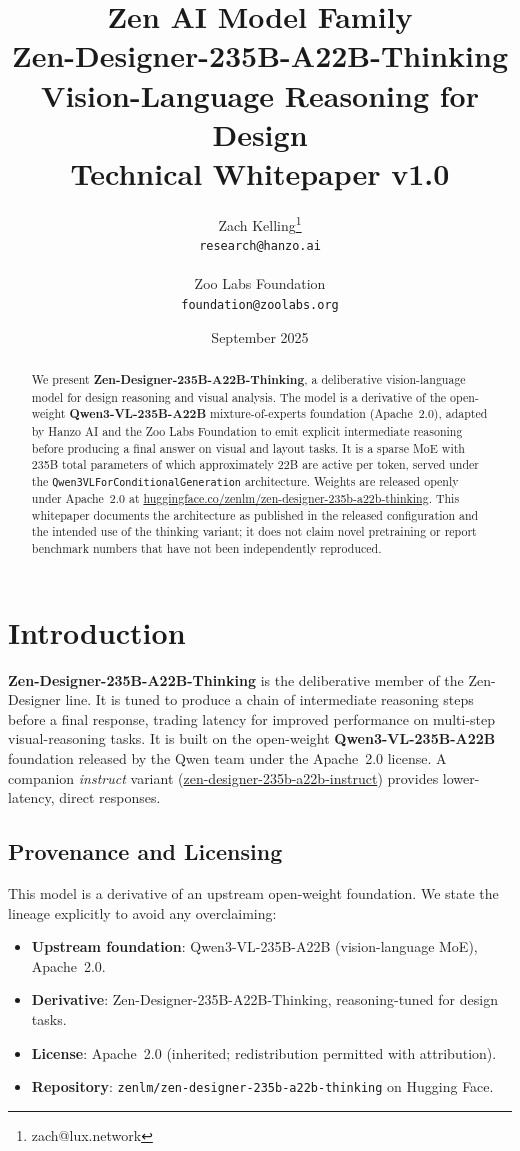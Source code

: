 \documentclass[11pt,a4paper]{article}
\title{
    \vspace{-2cm}
    \Large \textbf{Zen AI Model Family} \\
    \vspace{0.5cm}
    \Huge \textbf{Zen-Designer-235B-A22B-Thinking} \\
    \vspace{0.3cm}
    \large Vision-Language Reasoning for Design \\
    \vspace{0.5cm}
    \normalsize Technical Whitepaper v1.0
}
\author{
    Zach Kelling\thanks{zach@lux.network} \\
    \texttt{research@hanzo.ai} \\
    \\
    Zoo Labs Foundation \\
    \texttt{foundation@zoolabs.org}
}
\date{September 2025}
\begin{document}
\maketitle

\begin{abstract}
We present \textbf{Zen-Designer-235B-A22B-Thinking}, a deliberative vision-language model for
design reasoning and visual analysis. The model is a derivative of the open-weight
\textbf{Qwen3-VL-235B-A22B} mixture-of-experts foundation (Apache~2.0), adapted by Hanzo AI and
the Zoo Labs Foundation to emit explicit intermediate reasoning before producing a final answer
on visual and layout tasks. It is a sparse MoE with 235B total parameters of which approximately
22B are active per token, served under the \texttt{Qwen3VLForConditionalGeneration} architecture.
Weights are released openly under Apache~2.0 at
\href{https://huggingface.co/zenlm/zen-designer-235b-a22b-thinking}{huggingface.co/zenlm/zen-designer-235b-a22b-thinking}.
This whitepaper documents the architecture as published in the released configuration and the
intended use of the thinking variant; it does not claim novel pretraining or report benchmark
numbers that have not been independently reproduced.
\end{abstract}

\tableofcontents
\newpage

\section{Introduction}

\textbf{Zen-Designer-235B-A22B-Thinking} is the deliberative member of the Zen-Designer line. It
is tuned to produce a chain of intermediate reasoning steps before a final response, trading
latency for improved performance on multi-step visual-reasoning tasks. It is built on the
open-weight \textbf{Qwen3-VL-235B-A22B} foundation released by the Qwen team under the Apache~2.0
license. A companion \emph{instruct} variant
(\href{https://huggingface.co/zenlm/zen-designer-235b-a22b-instruct}{zen-designer-235b-a22b-instruct})
provides lower-latency, direct responses.

\subsection{Provenance and Licensing}
This model is a derivative of an upstream open-weight foundation. We state the lineage
explicitly to avoid any overclaiming:
\begin{itemize}
    \item \textbf{Upstream foundation}: Qwen3-VL-235B-A22B (vision-language MoE), Apache~2.0.
    \item \textbf{Derivative}: Zen-Designer-235B-A22B-Thinking, reasoning-tuned for design tasks.
    \item \textbf{License}: Apache~2.0 (inherited; redistribution permitted with attribution).
    \item \textbf{Repository}: \texttt{zenlm/zen-designer-235b-a22b-thinking} on Hugging Face.
\end{itemize}
\end{document}
